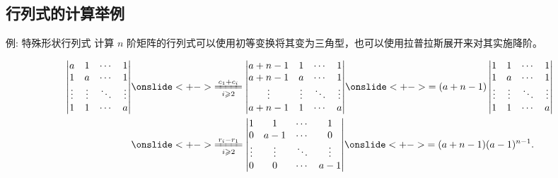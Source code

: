 \subsection{行列式的计算举例}


\begin{frame}{例: 特殊形状行列式}
	\onslide<+->
	计算 $n$ 阶矩阵的行列式可以使用初等变换将其变为三角型，也可以使用拉普拉斯展开来对其实施降阶。
	\onslide<+->
	\begin{example}
		\begin{align*}
			\begin{vmatrix}
				a&1&\cdots&1\\
				1&a&\cdots&1\\
				\vdots&\vdots&\ddots&\vdots\\
				1&1&\cdots&a
			\end{vmatrix}
		&\onslide<+->{\xeq[i\ge2]{c_1+c_i}\begin{vmatrix}
				a+n-1&1&\cdots&1\\
				a+n-1&a&\cdots&1\\
				\vdots&\vdots&\ddots&\vdots\\
				a+n-1&1&\cdots&a
			\end{vmatrix}}
		\onslide<+->{=(a+n-1)\begin{vmatrix}
				1&1&\cdots&1\\
				1&a&\cdots&1\\
				\vdots&\vdots&\ddots&\vdots\\
				1&1&\cdots&a
			\end{vmatrix}}\\
		&\onslide<+->{\xeq[i\ge2]{r_i-r_1}\begin{vmatrix}
				1&1&\cdots&1\\
				0&a-1&\cdots&0\\
				\vdots&\vdots&\ddots&\vdots\\
				0&0&\cdots&a-1
			\end{vmatrix}}
		\onslide<+->{=(a+n-1)(a-1)^{n-1}.}
		\end{align*}
	\end{example}
\end{frame}


